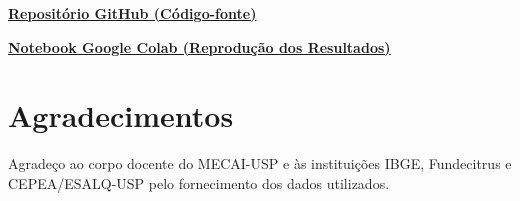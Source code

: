 \documentclass{wmecai}
\begin{document}
\begin{center} \href{https://github.com/alexferrei198170/WMECAI2026} {\textbf{Repositório GitHub (Código-fonte)}} \end{center} \begin{center} \href{https://colab.research.google.com/drive/1HIxed896Ux7tUNe0tLh2mcHkC6dtD6_T} {\textbf{Notebook Google Colab (Reprodução dos Resultados)}} \end{center}


\newpage
\section*{Agradecimentos}
Agradeço ao corpo docente do MECAI-USP e às instituições IBGE, Fundecitrus e CEPEA/ESALQ-USP pelo fornecimento dos dados utilizados.

\nocite{*}


\end{document}
